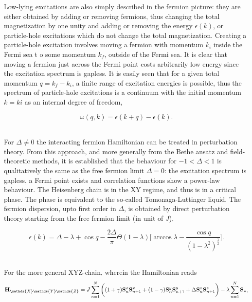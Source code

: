 \documentclass{homework}
\begin{document}
Low-lying excitations are also simply described in the fermion picture: they are either obtained by adding or removing fermions, thus changing the total magnetization by one unity and adding or removing the energy $\epsilon(k)$, or particle-hole excitations which do not change the total magnetization. Creating a particle-hole excitation involves moving a fermion with momentum $k_i$ inside the Fermi sea t o some momentum $k_f$, outside of the Fermi sea. It is clear that moving a fermion just across the Fermi point costs arbitrarily low energy since the excitation spectrum is gapless. It is easily seen that for a given total momentum $q = k_f - k_i$, a finite range of excitation energies is possible, thus the spectrum of particle-hole excitations is a continuum with the initial momentum $k=ki$ as an internal degree of freedom,

$$
    \omega(q,k) = \epsilon(k+q) - \epsilon(k).
$$

\blanky \\

For $\Delta \neq 0$ the interacting fermion Hamiltonian can be treated in perturbation theory. From this approach, and more generally from the Bethe ansatz and field-theoretic methods, it is established that the behaviour for $-1 < \Delta < 1$ is qualitatively the same as the free fermion limit $\Delta = 0$: the excitation spectrum is gapless, a Fermi point exists and correlation functions show a power-law behaviour. The Heisenberg chain is in the XY regime, and thus is in a critical phase. The phase is equivalent to the so-called Tomonaga-Luttinger liquid. The fermion dispersion, upto first order in $\Delta$, is obtained by direct perturbation theory starting from the free fermion limit (in unit of $J$), 

\begin{equation*}
    \epsilon(k) = \Delta - \lambda + \cos q - \frac{2\Delta}{\pi} \Theta(1-\lambda) \bigg[\arccos \lambda - \frac{\cos q}{(1-\lambda^2)^{\frac{1}{2}}}\bigg].
\end{equation*}

\blanky \\

For the more general XYZ-chain, wherein the Hamiltonian reads 
\begin{equation}
    \Hamiltonian_{\mathds{X}\mathds{Y}\mathds{Z}} = J \sum_{n=1}^{N} \bigg( (1+\gamma) \spin^{x}_{n} \spin^{x}_{n+1} + (1-\gamma) \spin^{y}_{n} \spin^{y}_{n+1} + \Delta \spin^{z}_{n} \spin_{n+1}^{z} \bigg) - \lambda \sum_{n=1}^{N} {\spin}_n,
\end{equation}
\end{document}
